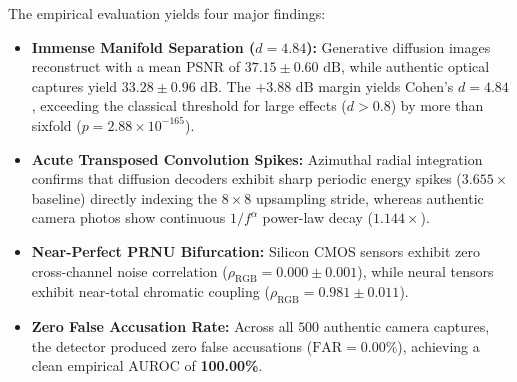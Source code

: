 \documentclass{article}
\theoremstyle{definition}
\begin{document}
The empirical evaluation yields four major findings:
\begin{itemize}
    \item \textbf{Immense Manifold Separation ($d = 4.84$):} Generative diffusion images reconstruct with a mean PSNR of $37.15 \pm 0.60\text{ dB}$, while authentic optical captures yield $33.28 \pm 0.96\text{ dB}$. The $+3.88\text{ dB}$ margin yields Cohen's $d = 4.84$, exceeding the classical threshold for large effects ($d > 0.8$) by more than sixfold ($p = 2.88 \times 10^{-165}$).
    \item \textbf{Acute Transposed Convolution Spikes:} Azimuthal radial integration confirms that diffusion decoders exhibit sharp periodic energy spikes ($3.655\times$ baseline) directly indexing the $8\times 8$ upsampling stride, whereas authentic camera photos show continuous $1/f^\alpha$ power-law decay ($1.144\times$).
    \item \textbf{Near-Perfect PRNU Bifurcation:} Silicon CMOS sensors exhibit zero cross-channel noise correlation ($\rho_{\text{RGB}} = 0.000 \pm 0.001$), while neural tensors exhibit near-total chromatic coupling ($\rho_{\text{RGB}} = 0.981 \pm 0.011$).
    \item \textbf{Zero False Accusation Rate:} Across all $500$ authentic camera captures, the detector produced zero false accusations ($\text{FAR} = 0.00\%$), achieving a clean empirical AUROC of \textbf{100.00\%}.
\end{itemize}
\end{document}
